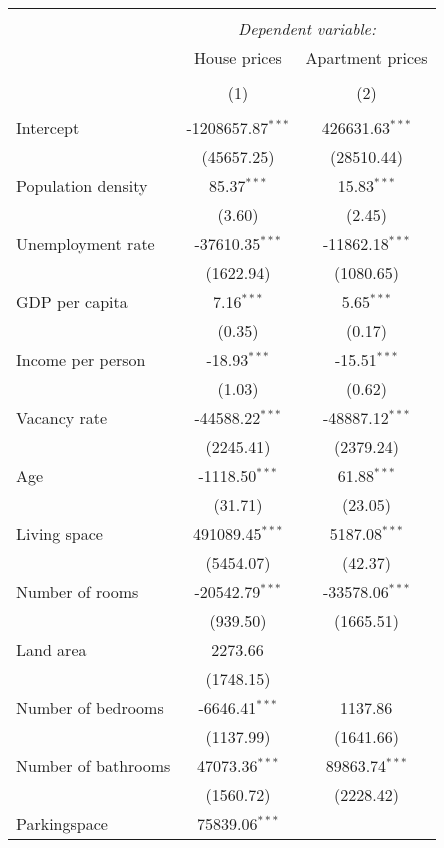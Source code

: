 \begin{table}[!htbp] \centering
\begin{tabular}{@{\extracolsep{5pt}}lcc}
\\[-1.8ex]\hline
\hline \\[-1.8ex]
& \multicolumn{2}{c}{\textit{Dependent variable:}} \
\cr \cline{2-3}
\\[-1.8ex] & \multicolumn{1}{c}{House prices} & \multicolumn{1}{c}{Apartment prices}  \\
\\[-1.8ex] & (1) & (2) \\
\hline \\[-1.8ex]
 Intercept & -1208657.87$^{***}$ & 426631.63$^{***}$ \\
  & (45657.25) & (28510.44) \\
 Population density & 85.37$^{***}$ & 15.83$^{***}$ \\
  & (3.60) & (2.45) \\
 Unemployment rate & -37610.35$^{***}$ & -11862.18$^{***}$ \\
  & (1622.94) & (1080.65) \\
 GDP per capita & 7.16$^{***}$ & 5.65$^{***}$ \\
  & (0.35) & (0.17) \\
 Income per person & -18.93$^{***}$ & -15.51$^{***}$ \\
  & (1.03) & (0.62) \\
 Vacancy rate & -44588.22$^{***}$ & -48887.12$^{***}$ \\
  & (2245.41) & (2379.24) \\
 Age & -1118.50$^{***}$ & 61.88$^{***}$ \\
  & (31.71) & (23.05) \\
 Living space & 491089.45$^{***}$ & 5187.08$^{***}$ \\
  & (5454.07) & (42.37) \\
 Number of rooms & -20542.79$^{***}$ & -33578.06$^{***}$ \\
  & (939.50) & (1665.51) \\
 Land area & 2273.66$^{}$ & \\
  & (1748.15) & \\
 Number of bedrooms & -6646.41$^{***}$ & 1137.86$^{}$ \\
  & (1137.99) & (1641.66) \\
 Number of bathrooms & 47073.36$^{***}$ & 89863.74$^{***}$ \\
  & (1560.72) & (2228.42) \\
 Parkingspace & 75839.06$^{***}$ & \\

\end{tabular}
\end{table}
